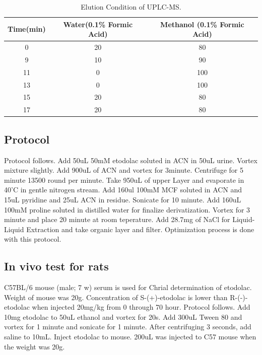 \documentclass[12pt]{article} %
\begin{document}
\begin{table}[h]
  \begin{center}
    \caption{Elution Condition of UPLC-MS.}
    \label{tab:table1}
    \begin{tabular}{ccc}
      \toprule
      Time(min) & Water(0.1\% Formic Acid) & Methanol (0.1\% Formic Acid) \\
      \midrule
      0 & 20 & 80 \\
      \midrule
      9 & 10 & 90 \\
      \midrule
      11 & 0 & 100 \\
      \midrule
      13 & 0 & 100 \\
      \midrule
      15 & 20 & 80 \\
      \midrule
      17 & 20 & 80 \\
      \bottomrule
    \end{tabular}
  \end{center}
\end{table}

\subsection {Protocol}
  Protocol follows. Add 50uL 50mM etodolac soluted in ACN in 50uL urine. Vortex mixture slightly. Add 900uL of ACN and vortex for 3minute. Centrifuge for 5 minute 13500 round per minute. Take 950uL of upper Layer and evaporate in 40'C in gentle nitrogen stream. Add 160ul 100mM MCF soluted in ACN and 15uL pyridine and 25uL ACN in residue. Sonicate for 10 minute. Add 160uL 100mM proline soluted in distilled water for finalize derivatization. Vortex for 3 minute and place 20 minute at room teperature. Add 28.7mg of NaCl for Liquid-Liquid Extraction and take organic layer and filter.
  Optimization process is done with this protocol.


\subsection {In vivo test for rats}
 C57BL/6 mouse (male; 7 w) serum is used for Chrial determination of \linebreak etodolac. Weight of mouse was 20g. Concentration of S-(+)-etodolac is lower than R-(-)-etodolac when injected 20mg/kg from 0 through 70 hour.\cite{cite2}
  Protocol follows. Add 10mg etodolac to 50uL ethanol and vortex for 20s. Add 300uL Tween 80 and vortex for 1 minute and sonicate for 1 minute. After centrifuging 3 seconds, add saline to 10mL. Inject etodolac to mouse.
  200uL was injected to C57 mouse when the weight was 20g.
\end{document}
